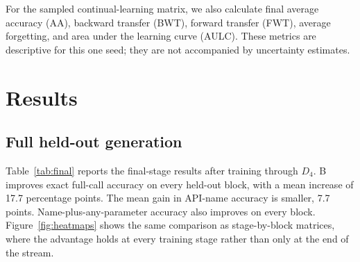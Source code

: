 \documentclass{article}
\begin{document}
For the sampled continual-learning matrix, we also calculate final average accuracy (AA), backward transfer (BWT), forward transfer (FWT), average forgetting, and area under the learning curve (AULC). These metrics are descriptive for this one seed; they are not accompanied by uncertainty estimates.

\section{Results}
\label{sec:pilot}

\subsection{Full held-out generation}

Table~\ref{tab:final} reports the final-stage results after training through $D_4$. B improves exact full-call accuracy on every held-out block, with a mean increase of 17.7 percentage points. The mean gain in API-name accuracy is smaller, 7.7 points. Name-plus-any-parameter accuracy also improves on every block. Figure~\ref{fig:heatmaps} shows the same comparison as stage-by-block matrices, where the advantage holds at every training stage rather than only at the end of the stream.

\begin{table}[t]
\centering
\caption{Full held-out generation results after sequential training through $D_4$. Values are percentages.}
\label{tab:final}
\end{table}
\end{document}
